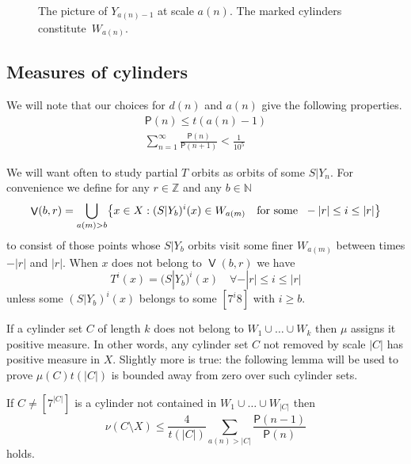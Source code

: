\documentclass[AHL,Unicode,longabstracts,published]{cedram}
\DeclareMathOperator{\bad}{\mathsf{V}}
\DeclareMathOperator{\Q}{\mathsf{Q}}
\newcommand{\N}{\mathbb{N}}
\newcommand{\Z}{\mathbb{Z}}
\renewcommand{\P}{\mathsf{P}}
\let\originalleft\left
\let\originalright\right
\renewcommand{\left}{\mathopen{}\mathclose\bgroup\originalleft}
\renewcommand{\right}{\aftergroup\egroup\originalright}
\let\oldforall\forall
\renewcommand*{\forall}{\mathrel{\oldforall}}
\begin{document}
\begin{figure}[!h]

\caption{The picture of $Y_{a(n)-1}$ at scale $a(n)$. The marked cylinders constitute~$W_{a(n)}$.}\label{fig:unbounded_removal}
\end{figure}


\subsection{Measures of cylinders}


We will note that our choices for $d(n)$ and $a(n)$ give the following properties.
\begin{align}
\tag{$\rm P1$}
\P(n) \le t(a(n)-1)\label{p:tower_height}\\
\tag{$\rm P2$}\label{p:summing_gaps}
\sum_{n=1}^\infty \frac{\P(n)}{\P(n+1)} < \frac{1}{10^5}
\end{align}


We will want often to study partial $T$ orbits as orbits of some $S|Y_n$. For convenience we define for any $r \in \Z$ and any $b \in \N$
\[
\bad(b,r) = \bigcup_{a(m) > b} \left\{x \in X : (S|Y_b)^i(x) \in W_{a(m)} \quad\text{for some }\; -|r| \le i \le |r| \right\}
\]
to consist of those points whose $S|Y_b$ orbits visit some finer $W_{a(m)}$ between times $-|r|$ and $|r|$. When $x$ does not belong to $\bad(b,r)$ we have
\[
T^i(x) = (S|Y_b)^i(x)\quad \forall -|r| \le i \le |r|
\]
unless some $(S|Y_b)^i(x)$ belongs to some $[7^i 8]$ with $i \ge b$.



If a cylinder set $C$ of length $k$ does not belong to $W_1 \cup \dots \cup W_k$ then $\mu$ assigns it positive measure. In other words, any cylinder set $C$ not removed by scale $|C|$ has positive measure in $X$. Slightly more is true: the following lemma will be used to prove $\mu(C) t(|C|)$ is bounded away from zero over such cylinder sets.

\begin{lemm}\label{lem:cylinder_decay}
If $C \ne [7^{|C|}]$ is a cylinder not contained in $W_1 \cup \dots \cup W_{|C|}$ then
\[
\nu(C \setminus X) \le \frac{4}{t(|C|)} \sum_{a(n) > |C|} \frac{\P(n-1)}{\P(n)}
\]
holds.
\end{lemm}
\end{document}
